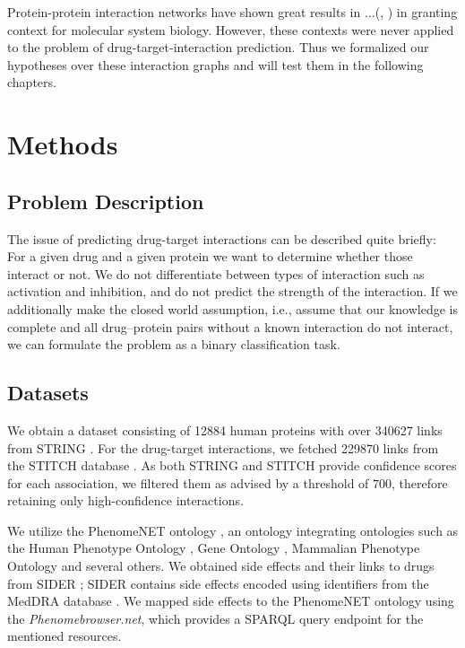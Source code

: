 \documentclass{bioinfo}
\renewcommand{\cite}{\citep}
\begin{document}
Protein-protein interaction networks have shown great results in
$\dots$(\cite{Vazquez2003}, \cite{Ackerman2019}) in granting context
for molecular system biology. However, these contexts were never
applied to the problem of drug-target-interaction prediction. Thus we
formalized our hypotheses over these interaction graphs and will test
them in the following chapters.

\enlargethispage{12pt}

\section{Methods}
\subsection{Problem Description}
The issue of predicting drug-target interactions can be described
quite briefly: For a given drug and a given protein we want to
determine whether those interact or not.  We do not differentiate
between types of interaction such as activation and inhibition, and do
not predict the strength of the interaction.  If we additionally make
the closed world assumption, i.e., assume that our knowledge is
complete and all drug--protein pairs without a known interaction do
not interact, we can formulate the problem as a binary classification
task.


\subsection{Datasets}
We obtain a dataset consisting of 12884 human proteins with over 340627 links from STRING
\citep{STRINGv10}. For the drug-target interactions, we
fetched 229870 links from the STITCH database
\citep{STITCHv5}. As both STRING and STITCH provide confidence scores
for each association, we filtered them as advised by a threshold of
$700$, therefore retaining only high-confidence interactions.

We utilize the PhenomeNET ontology \citep{PhenomeNET2011}, an ontology
integrating ontologies such as the Human Phenotype Ontology
\citep{HPO2018}, Gene Ontology \cite{GOoriginal2000, GOrecent2020},
Mammalian Phenotype Ontology \citep{MP2009} and several others.
We obtained side effects and their links to drugs from SIDER
\citep{SIDER}; SIDER contains side effects encoded using identifiers
from the MedDRA database \citep{MedDRA}. We mapped side effects to the
PhenomeNET ontology using the \textit{Phenomebrowser.net}, which
provides a SPARQL query endpoint for the mentioned resources.
\end{document}
